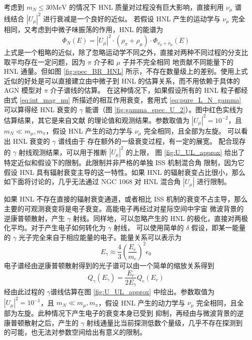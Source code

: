 \documentclass[printMode=false, declarePage=false]{ecnuthesis}
\begin{document}
考虑到 $m_N \leq 30 \text{MeV}$ 的情况下 HNL 质量对过程没有巨大影响，直接利用 $\nu_\mu$ 谱线结合 $|U_\mu|^2$
进行衰减是一个良好的近似。 
若假设 HNL 产生的运动学与 $\nu_\mu$ 完全相同，又考虑到中微子味振荡的作用，HNL 的能谱为
\begin{equation}
  \Phi_N (E) = |U_\mu|^2 \cdot (\rho_\pi + \rho_\mu) \cdot \Phi_{\nu_\mu + \bar{\nu}_\mu} (E) \label{eq:approx_spec}
\end{equation}
上式是一个粗略的近似，除了忽略运动学不同之外，直接对两种不同过程的分支比取平均存在一定问题，因为 $\pi$ 介子和 $\mu$ 子并不完全相同
地贡献不同能量下的 HNL 通量。但如图 \ref{fig:spec_BR_HNL} 所示，不存在数量级上的差别。使用上式近似的好处是可以直接建立由中微子到
HNL 的估算关系，而不用依赖于具体的 AGN 模型对 $\pi$ 介子谱线的估算。
在这种情况下，如果假设所有的 HNL 粒子都经由式 \ref{eq:int_mag_nu} 所描述的相互作用衰变，套用式 \ref{eq:pure_L_N_gamma} 可以算得经
HNL 衰变的 $\gamma$ 能谱（图 \ref{fig:gamma_spec_U_2}）。图中红色实线为估算结果，其它是来自文献 \cite{icecube2022evidence}
的理论值和观测结果。参数取值为
$|U_\mu|^2 = 10^{-2}$，且 $m_N \ll m_\mu, m_\pi$，假设 HNL 产生的动力学与 $\nu_\mu$ 完全相同，且全部为左旋。
可以看出 HNL 衰变的 $\gamma$ 谱线由于
存在额外的一级衰变过程，有一定的展宽。
配合现存的 $\gamma$ 射线观测结果，可以用于推断 $|U_\mu|^2$ 的上限，
图 \ref{fig:U_UL_approx} 给出了特定近似和假设下的限制。此限制并非严格的单独 ISS 机制混合角
限制，因为它假设 HNL 具有辐射衰变主导的这一特性。如果 HNL 的辐射衰变占比很小，那么如下面将讨论的，几乎无法通过
NGC 1068 对 HNL 混合角 $|U_\mu|$ 进行限制。

如果 HNL 不存在直接的辐射衰变通道，或者相比 ISS 机制的衰变不占主导，那么主要的可观测衰变将是电子衰变。高能电子再经过对星际空间中宇宙
微波背景的逆康普顿散射，产生 $\gamma$ 射线。同样地，可以忽略产生的 HNL 的极化，直接对两极化平均。对于产生电子如何转化为 $\gamma$ 射线，
可以使用简单的 $\delta$ 假设，即某一能量的 $\gamma$ 光子完全来自于相应能量的电子。能量关系可以表示为 \cite{RevModPhys.42.237}
\begin{equation}
  E_\gamma \approx \frac{4}{3} \left( \frac{E_e}{m_e} \right)^2 \epsilon_0
\end{equation}
电子谱经由逆康普顿散射得到的光子谱可以由一个简单的缩放关系得到
\begin{equation}
  Q_\gamma(E_\gamma) = \frac{E_e}{2 E_\gamma} Q_e(E_e) 
\end{equation}
经由此过程的 $\gamma$谱线估算在图 \ref{fig:U_UL_approx} 中绘出。参数取值为
$|U_\mu|^2 = 10^{-1}$，且 $m_N \ll m_\mu, m_\pi$，假设 HNL 产生的动力学与 $\nu_\mu$ 完全相同，且全部为左旋。此种情况下产生电子的衰变本身已受到
抑制，再经由与微波背景的逆康普顿散射之后，产生的 $\gamma$ 射线通量比当前探测低数个量级，几乎不存在探测到的可能，也无法对参数空间给出有意义的限制。
\end{document}
